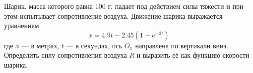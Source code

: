 Шарик, масса которого равна $100$ г, падает под действием силы тяжести
и при этом испытывает сопротивление воздуха.
Движение шарика выражается уравнением
$$x = 4.9t - 2.45(1 -e^{-2t})$$
где $x$ --- в метрах, $t$ --- в секундах,
ось $O_x$ направлена по вертикали вниз.
Определить силу сопротивления воздуха $R$
и выразить её как функцию скорости шарика.

